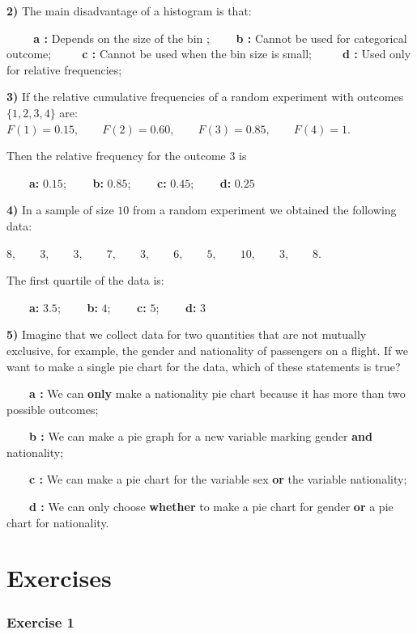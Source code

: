 \documentclass[
]{book}
\begin{document}
\textbf{2)} The main disadvantage of a histogram is that:

\textbf{\(\qquad\) a :} Depends on the size of the bin ; \textbf{\(\qquad\)b :} Cannot be used for categorical outcome;
\textbf{\(\qquad\) c :} Cannot be used when the bin size is small;
\textbf{\(\qquad\) d :} Used only for relative frequencies;

\textbf{3)} If the relative cumulative frequencies of a random experiment with outcomes \(\{1,2,3,4\}\) are: \(F(1)=0.15, \qquad F(2)=0.60, \qquad F(3)=0.85, \qquad F(4)=1\).

Then the relative frequency for the outcome \(3\) is

\textbf{\(\qquad\)a:} \(0.15\); \textbf{\(\qquad\)b:} \(0.85\); \textbf{\(\qquad\)c:} \(0.45\); \textbf{\(\qquad\)d:} \(0.25\)

\textbf{4)} In a sample of size \(10\) from a random experiment we obtained the following data:

\(8, \qquad 3, \qquad 3, \qquad 7, \qquad 3, \qquad 6, \qquad 5, \qquad 10, \qquad 3, \qquad 8\).

The first quartile of the data is:

\textbf{\(\qquad\)a:} \(3.5\); \textbf{\(\qquad\)b:} \(4\); \textbf{\(\qquad\)c:} \(5\); \textbf{\(\qquad\)d:} \(3\)

\textbf{5)} Imagine that we collect data for two quantities that are not mutually exclusive, for example, the gender and nationality of passengers on a flight. If we want to make a single pie chart for the data, which of these statements is true?

\textbf{\(\qquad\)a :} We can \textbf{only} make a nationality pie chart because it has more than two possible outcomes;

\textbf{\(\qquad\)b :} We can make a pie graph for a new variable marking gender \textbf{and} nationality;

\textbf{\(\qquad\)c :} We can make a pie chart for the variable sex \textbf{or} the variable nationality;

\textbf{\(\qquad\)d :} We can only choose \textbf{whether} to make a pie chart for gender \textbf{or} a pie chart for nationality.

\hypertarget{exercises}{%
\section{Exercises}\label{exercises}}

\hypertarget{exercise-1}{%
\subsubsection{Exercise 1}\label{exercise-1}}
\end{document}
